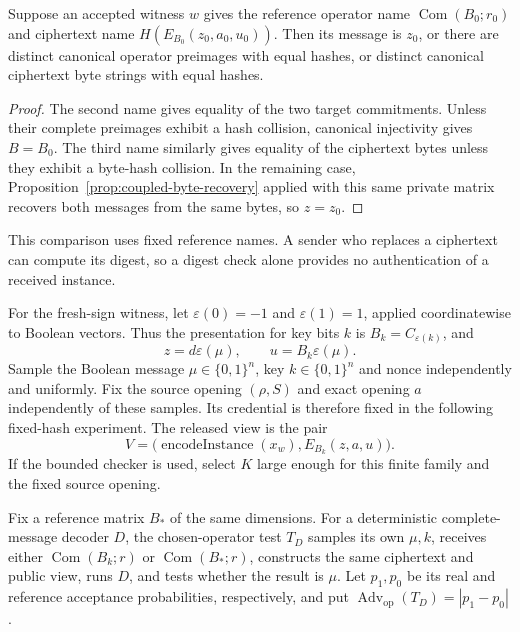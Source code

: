\begin{proposition}
\label{prop:coupled-committed-recovery}
Suppose an accepted witness \(w\) gives the reference operator name
\(\operatorname{Com}(B_0;r_0)\) and ciphertext name
\(H(E_{B_0}(z_0,a_0,u_0))\). Then its message is \(z_0\), or there are
distinct canonical operator preimages with equal hashes, or distinct
canonical ciphertext byte strings with equal hashes.
\end{proposition}

\begin{proof}
The second name gives equality of the two target commitments. Unless their
complete preimages exhibit a hash collision, canonical injectivity gives
\(B=B_0\). The third name similarly gives equality of the ciphertext bytes
unless they exhibit a byte-hash collision. In the remaining case,
Proposition~\ref{prop:coupled-byte-recovery} applied with this same private
matrix recovers both messages from the same bytes, so \(z=z_0\).
\end{proof}

This comparison uses fixed reference names. A sender who replaces a
ciphertext can compute its digest, so a digest check alone provides no
authentication of a received instance.

For the fresh-sign witness, let \(\varepsilon(0)=-1\) and
\(\varepsilon(1)=1\), applied coordinatewise to Boolean vectors. Thus the
presentation for key bits \(k\) is \(B_k=C_{\varepsilon(k)}\), and
\[
 z=d\varepsilon(\mu),\qquad u=B_k\varepsilon(\mu).
\]
Sample the Boolean message \(\mu\in\{0,1\}^n\), key \(k\in\{0,1\}^n\)
and nonce independently and uniformly. Fix the source opening \((\rho,S)\)
and exact opening \(a\) independently of these samples. Its credential is
therefore fixed in the following fixed-hash experiment. The released view
is the pair
\[
 V=\bigl(\operatorname{encodeInstance}(x_w),E_{B_k}(z,a,u)\bigr).
\]
If the bounded checker is used, select \(K\) large enough for this finite
family and the fixed source opening.

Fix a reference matrix \(B_*\) of the same dimensions. For a deterministic
complete-message decoder \(D\), the chosen-operator test \(T_D\) samples
its own \(\mu,k\), receives either \(\operatorname{Com}(B_k;r)\) or
\(\operatorname{Com}(B_*;r)\), constructs the same ciphertext and public
view, runs \(D\), and tests whether the result is \(\mu\). Let \(p_1,p_0\)
be its real and reference acceptance probabilities, respectively, and put
\(\operatorname{Adv}_{\mathrm{op}}(T_D)=|p_1-p_0|\).

